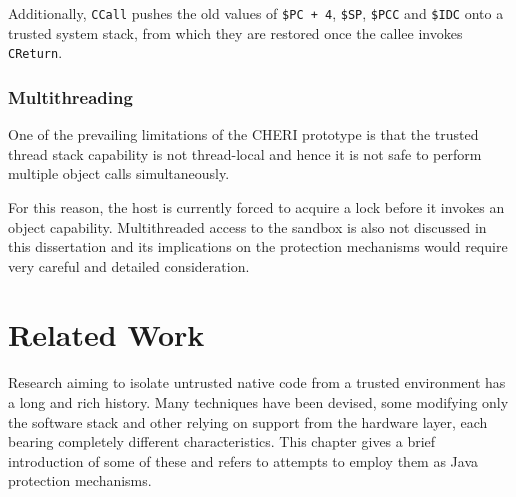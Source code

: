 \documentclass[a4paper,12pt,twoside,openright]{report}
\newcommand{\reg}[1]{\texttt{\$#1}}
\newcommand{\insn}[1]{\texttt{#1}}
\begin{document}
Additionally, \insn{CCall} pushes the old values of \texttt{\reg{PC}~+~4}, \reg{SP}, \reg{PCC} and \reg{IDC} onto a trusted system stack, from which they are restored once the callee invokes \insn{CReturn}.

\subsection{Multithreading}

One of the prevailing limitations of the CHERI prototype is that the trusted thread stack capability is not thread-local and hence it is not safe to perform multiple object calls simultaneously. 

For this reason, the host is currently forced to acquire a lock before it invokes an object capability. Multithreaded access to the sandbox is also not discussed in this dissertation and its implications on the protection mechanisms would require very careful and detailed consideration.

\chapter{Related Work} 

% 
% 

Research aiming to isolate untrusted native code from a trusted environment has a long and rich history. Many techniques have been devised, some modifying only the software stack and other relying on support from the hardware layer, each bearing completely different characteristics. This chapter gives a brief introduction of some of these and refers to attempts to employ them as Java protection mechanisms.
\end{document}
